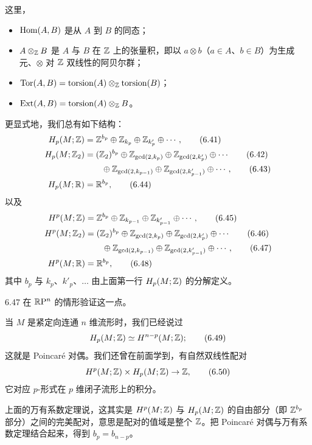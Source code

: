 这里，
\begin{itemize}
  \item $\operatorname{Hom}(A,B)$ 是从 $A$ 到 $B$ 的同态；
  \item $A\otimes_{\mathbb{Z}} B$ 是 $A$ 与 $B$ 在 $\mathbb{Z}$ 上的张量积，即以 $a\otimes b$（$a\in A$、$b\in B$）为生成元、$\otimes$ 对 $\mathbb{Z}$ 双线性的阿贝尔群；
  \item $\operatorname{Tor}(A,B)=\operatorname{torsion}(A)\otimes_{\mathbb{Z}}\operatorname{torsion}(B)$；
  \item $\operatorname{Ext}(A,B)=\operatorname{torsion}(A)\otimes_{\mathbb{Z}} B$。
\end{itemize}

更显式地，我们总有如下结构：
\begin{align}
  H_p(M;\mathbb{Z})&=\mathbb{Z}^{b_p}\oplus\mathbb{Z}_{k_p}\oplus\mathbb{Z}_{k'_p}\oplus\cdots, \tag{6.41}\\
  H_p(M;\mathbb{Z}_2)&=(\mathbb{Z}_2)^{b_p}\oplus\mathbb{Z}_{\gcd(2,k_p)}\oplus\mathbb{Z}_{\gcd(2,k'_p)}\oplus\cdots \tag{6.42}\\
  &\qquad\oplus\mathbb{Z}_{\gcd(2,k_{p-1})}\oplus\mathbb{Z}_{\gcd(2,k'_{p-1})}\oplus\cdots, \tag{6.43}\\
  H_p(M;\mathbb{R})&=\mathbb{R}^{b_p}, \tag{6.44}
\end{align}
以及
\begin{align}
  H^p(M;\mathbb{Z})&=\mathbb{Z}^{b_p}\oplus\mathbb{Z}_{k_{p-1}}\oplus\mathbb{Z}_{k'_{p-1}}\oplus\cdots, \tag{6.45}\\
  H^p(M;\mathbb{Z}_2)&=(\mathbb{Z}_2)^{b_p}\oplus\mathbb{Z}_{\gcd(2,k_p)}\oplus\mathbb{Z}_{\gcd(2,k'_p)}\oplus\cdots \tag{6.46}\\
  &\qquad\oplus\mathbb{Z}_{\gcd(2,k_{p-1})}\oplus\mathbb{Z}_{\gcd(2,k'_{p-1})}\oplus\cdots, \tag{6.47}\\
  H^p(M;\mathbb{R})&=\mathbb{R}^{b_p}, \tag{6.48}
\end{align}
其中 $b_p$ 与 $k_p$、$k'_p$、$\dots$ 由上面第一行 $H_p(M;\mathbb{Z})$ 的分解定义。

\begin{question}{6.47}
  在 $\mathbb{R}\mathrm{P}^n$ 的情形验证这一点。
\end{question}

当 $M$ 是紧定向连通 $n$ 维流形时，我们已经说过
\begin{equation}
  H_p(M;\mathbb{Z})\simeq H^{n-p}(M;\mathbb{Z});
  \tag{6.49}
\end{equation}
这就是 Poincaré 对偶。我们还曾在前面学到，有自然双线性配对
\begin{equation}
  H^p(M;\mathbb{Z})\times H_p(M;\mathbb{Z})\to\mathbb{Z},
  \tag{6.50}
\end{equation}
它对应 $p$-形式在 $p$ 维闭子流形上的积分。

上面的万有系数定理说，这其实是 $H^p(M;\mathbb{Z})$ 与 $H_p(M;\mathbb{Z})$ 的自由部分（即 $\mathbb{Z}^{b_p}$ 部分）之间的完美配对，意思是配对的值域是整个 $\mathbb{Z}$。把 Poincaré 对偶与万有系数定理结合起来，得到 $b_p=b_{n-p}$。

